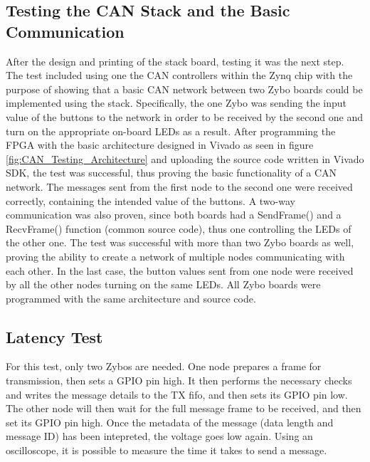 
\subsection{Testing the CAN Stack and the Basic Communication}
\label{sub:TestingCANStack_BareMetal}
After the design and printing of the stack board, testing it was the next step.
The test included using one the CAN controllers within the Zynq chip with the purpose of showing that a basic CAN network between two Zybo boards could be implemented using the stack.
Specifically, the one Zybo was sending the input value of the buttons to the network in order to be received by the second one and turn on the appropriate on-board LEDs as a result.
After programming the FPGA with the basic architecture designed in Vivado as seen in figure \ref{fig:CAN_Testing_Architecture} and uploading the source code written in Vivado SDK, the test was successful, thus proving the basic functionality of a CAN network.
The messages sent from the first node to the second one were received correctly, containing the intended value of the buttons.
A two-way communication was also proven, since both boards had a SendFrame() and a RecvFrame() function (common source code), thus one controlling the LEDs of the other one.
The test was successful with more than two Zybo boards as well, proving the ability to create a network of multiple nodes communicating with each other.
In the last case, the button values sent from one node were received by all the other nodes turning on the same LEDs.
All Zybo boards were programmed with the same architecture and source code.

\subsection{Latency Test}\label{sub:CAN_latency}
For this test, only two Zybos are needed.
One node prepares a frame for transmission, then sets a GPIO pin high.
It then performs the necessary checks and writes the message details to the TX fifo, and then sets its GPIO pin low. \\
The other node will then wait for the full message frame to be received, and then set its GPIO pin high.
Once the metadata of the message (data length and message ID) has been intepreted, the voltage goes low again.
Using an oscilloscope, it is possible to measure the time it takes to send a message.\\

